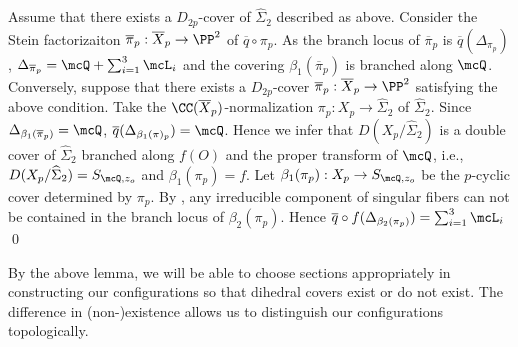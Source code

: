  \proof Assume that there exists a $D_{2p}$-cover of $\widehat{\Sigma}_2$ described as above. Consider 
 the Stein factorizaiton $\overline{\pi}_p : \overline{X}_p \to \PP^2$ of $\overline{q}\circ \pi_p$. As the branch
 locus of $\overline{\pi}_p$ is $\overline {q}(\Delta_{\pi_p})$, 
 $\Delta_{\overline{\pi}_p} = \mcQ + \sum_{i=1}^3 \mcL_i$ %
  and the covering $\beta_1(\overline{\pi}_p)$ is branched along $\mcQ$. Conversely, suppose that there exists a $D_{2p}$-cover 
 $\overline{\pi}_p : \overline{X}_p \to \PP^2$ satisfying the above condition.
 Take the $\CC(\overline{X}_p)$-normalization $\pi_p : X_p \to \widehat{\Sigma}_2$ of $\widehat{\Sigma}_2$.
 Since $\Delta_{\beta_1(\overline{\pi}_p)} = \mcQ$, $\overline{q}(\Delta_{\beta_1(\pi)_p}) = \mcQ$. Hence we infer 
 that $D(X_p/\widehat{\Sigma}_2)$ is a double cover of $\widehat{\Sigma}_2$ branched along $f(O)$ and the 
 proper transform of $\mcQ$, i.e., $D(X_p/\widehat{\Sigma}_2) = S_{\mcQ, z_o}$ and $\beta_1(\pi_p) = f$. 
 Let $\beta_1(\pi_p) : X_p \to S_{\mcQ, z_o}$ be the $p$-cyclic cover determined by $\pi_p$. By \cite[Remark 3.1, (i)]{tokunaga14},
 any irreducible component of singular fibers can not be contained in the branch locus of $\beta_2(\pi_p)$. Hence
 $\overline{q}\circ f(\Delta_{\beta_2(\pi_p)}) = \sum_{i=1}^3 \mcL_i$ %
 \qed
 
By the above lemma, we will be able to choose sections appropriately in constructing our configurations so that dihedral covers exist or do not exist. The difference in (non-)existence allows us to distinguish our configurations topologically. 
\bigskip

